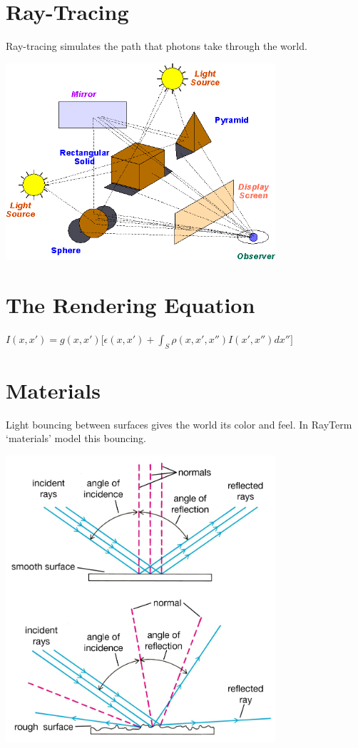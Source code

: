 \documentclass[alleghenyposter]{betterposter}
\begin{document}
{}{

\section{Ray-Tracing}
Ray-tracing simulates the path that photons take through the world.

\begin{center}
\includegraphics[width=0.75\textwidth]{img/world}
\end{center}

\section{The Rendering Equation}
\vspace{-1.5em}
\begin{center}
$I(x, x') = g(x, x') \Big[\epsilon(x, x') + \int_{S} \rho(x, x',x'')I(x', x'')dx''\Big]$
\end{center}

\section{Materials}
Light bouncing between surfaces gives the world its color and feel.
In RayTerm `materials' model this bouncing.

\begin{center}
\includegraphics[width=0.75\textwidth]{img/surface}
\end{center}

}
\end{document}
